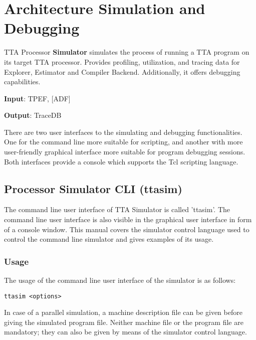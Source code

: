 \documentclass[twoside]{tceusermanual}
\begin{document}

\section{Architecture Simulation and Debugging}

TTA Processor \textbf{Simulator} simulates the process of running a TTA
program on its target TTA processor. Provides profiling, utilization, and 
tracing data for Explorer, Estimator and Compiler Backend.  Additionally, 
it offers debugging capabilities. 

\textbf{Input}: TPEF, [ADF]

\textbf{Output}: TraceDB

There are two user interfaces to the simulating and debugging
functionalities. One for the command line more suitable for scripting, and
another with more user-friendly graphical interface more suitable for
program debugging sessions. Both interfaces provide a console which
supports the Tcl scripting language.

\subsection{Processor Simulator CLI (ttasim)}
\label{section:ttasim}

The command line user interface of TTA Simulator is called 'ttasim'. The command
line user interface is also visible in the graphical user interface in form of a
console window. This manual covers the simulator control language used to
control the command line simulator and gives examples of its usage.

\subsubsection{Usage}

The usage of the command line user interface of the simulator is as follows:

\begin{verbatim}
ttasim <options>
\end{verbatim}

In case of a parallel simulation, a machine description file can be given before
giving the simulated program file. Neither machine file or the program file are mandatory;
they can also be given by means of the simulator control language.
\end{document}
